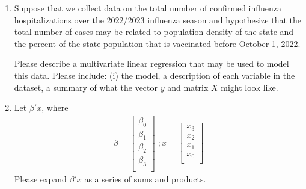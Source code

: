 \begin{enumerate}
    \item Suppose that we collect data on the total number of confirmed influenza hospitalizations over the 2022/2023 influenza season and hypothesize that the total number of cases may be related to population density of the state and the percent of the state population that is vaccinated before October 1, 2022.
    
    Please describe a multivariate linear regression that may be used to model this data. Please include: (i) the model, a description of each variable in the dataset, a summary of what the vector $y$ and matrix $X$ might look like.
    
    \item Let $\beta' x$, where 
    \begin{align*}
        \beta = \begin{bmatrix}
                    \beta_{0}\\
                    \beta_{1}\\
                    \beta_{2}\\
                    \beta_{3}\\
                 \end{bmatrix}\; ; 
                 x   = \begin{bmatrix}
                    x_{3}\\
                    x_{2}\\
                    x_{1}\\
                    x_{0}\\
                 \end{bmatrix}
    \end{align*}
    Please expand $\beta'x$ as a series of sums and products.
   
    
\end{enumerate}






